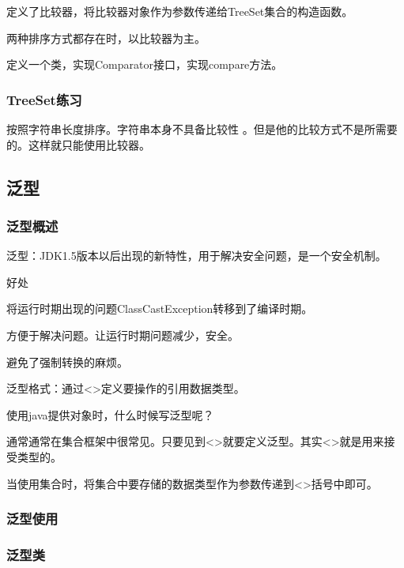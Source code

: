 \documentclass[UTF8]{ctexart}
\begin{document}
定义了比较器，将比较器对象作为参数传递给TreeSet集合的构造函数。

两种排序方式都存在时，以比较器为主。

定义一个类，实现Comparator接口，实现compare方法。


\subsubsection{TreeSet练习}

\textbullet 按照字符串长度排序。字符串本身不具备比较性	。但是他的比较方式不是所需要的。这样就只能使用比较器。


\subsection{泛型}
\subsubsection{泛型概述}

泛型：JDK1.5版本以后出现的新特性，用于解决安全问题，是一个安全机制。

好处

\textbullet 将运行时期出现的问题ClassCastException转移到了编译时期。

\qquad 方便于解决问题。让运行时期问题减少，安全。

\textbullet 避免了强制转换的麻烦。

泛型格式：通过<>定义要操作的引用数据类型。

使用java提供对象时，什么时候写泛型呢？

通常通常在集合框架中很常见。只要见到<>就要定义泛型。其实<>就是用来接受类型的。

当使用集合时，将集合中要存储的数据类型作为参数传递到<>括号中即可。



\subsubsection{泛型使用}


\subsubsection{泛型类}
\end{document}
